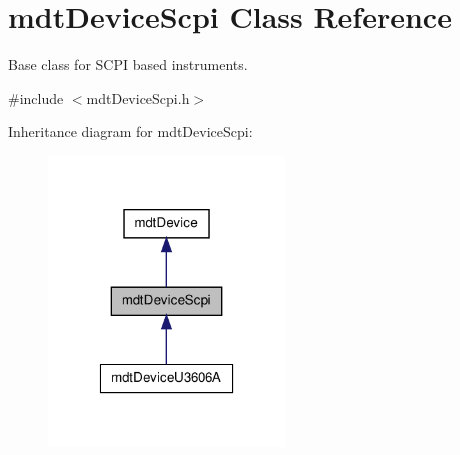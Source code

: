 \hypertarget{classmdt_device_scpi}{
\section{mdtDeviceScpi Class Reference}
\label{classmdt_device_scpi}
}


Base class for SCPI based instruments.  




{\ttfamily \#include $<$mdtDeviceScpi.h$>$}



Inheritance diagram for mdtDeviceScpi:\nopagebreak
\begin{figure}[H]
\begin{center}
\leavevmode
\includegraphics[width=178pt]{classmdt_device_scpi__inherit__graph}
\end{center}
\end{figure}


